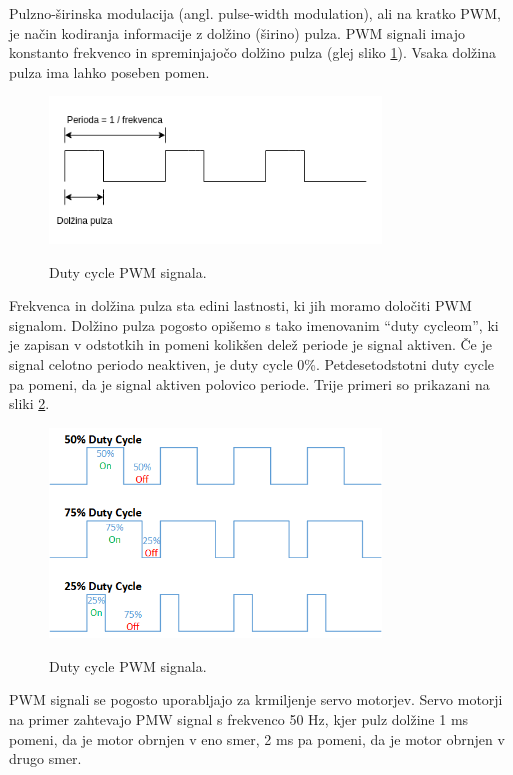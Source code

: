 \documentclass[12pt,letterpaper]{article}
\begin{document}
Pulzno-širinska modulacija (angl. pulse-width modulation), ali na kratko PWM, je način kodiranja informacije z dolžino (širino) pulza. PWM signali imajo konstanto frekvenco in spreminjajočo dolžino pulza (glej sliko \ref{period_pulse}). Vsaka dolžina pulza ima lahko poseben pomen.

\begin{figure}[ht!]
  \centering
  \caption{Duty cycle PWM signala.}
  \includegraphics[width=250pt]{images/vaja7/perioda_pulz.png}
  \label{period_pulse}
\end{figure}

Frekvenca in dolžina pulza sta edini lastnosti, ki jih moramo določiti PWM signalom. Dolžino pulza pogosto opišemo s tako imenovanim ``duty cycleom'', ki je zapisan v odstotkih in pomeni kolikšen delež periode je signal aktiven. Če je signal celotno periodo neaktiven, je duty cycle 0\%. Petdesetodstotni duty cycle pa pomeni, da je signal aktiven polovico periode. Trije primeri so prikazani na sliki \ref{dutycycle}.

\begin{figure}[ht!]
  \centering
  \caption{Duty cycle PWM signala.}
  \includegraphics[width=250pt]{images/vaja7/dutycycle.png}
  \label{dutycycle}
\end{figure}

PWM signali se pogosto uporabljajo za krmiljenje servo motorjev. Servo motorji na primer zahtevajo PMW signal s frekvenco 50 Hz, kjer pulz dolžine 1 ms pomeni, da je motor obrnjen v eno smer, 2 ms pa pomeni, da je motor obrnjen v drugo smer.
\end{document}
